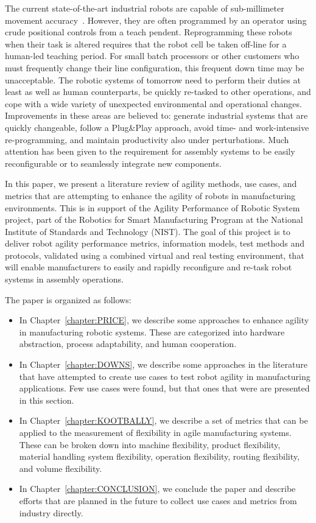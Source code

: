 The current state-of-the-art industrial robots are capable of sub-millimeter movement accuracy~\cite{Briot.2009}. However, they are often programmed by an operator using crude positional controls from a teach pendent. Reprogramming these robots when their task is altered requires that the robot cell be taken off-line for a human-led teaching period. For small batch processors or other
customers who must frequently change their line configuration, this frequent down time may be unacceptable. The robotic systems of tomorrow need to perform their duties at least as well as human counterparts, be quickly re-tasked to other operations, and cope with a wide variety of unexpected environmental and operational changes. Improvements in these areas are believed to: generate industrial systems that are quickly changeable, follow a Plug\&Play approach, avoid time- and work-intensive re-programming,
and maintain productivity also under perturbations. Much attention has been given to the requirement for assembly systems to be easily reconfigurable or to seamlessly integrate
new components.

In this paper, we present a literature review of agility methods, use cases, and metrics that are attempting to enhance the agility of robots in manufacturing environments.  This is in support of the Agility Performance of Robotic System project, part of the Robotics for Smart Manufacturing Program at the National Institute of Standards and Technology (NIST). The goal of this project is to deliver robot agility performance metrics, information models, test methods and protocols, validated using a combined virtual and real testing environment, that will enable manufacturers to easily and rapidly reconfigure and re-task robot systems in assembly operations.

The paper is organized as follows:
\begin{itemize}
\item In Chapter~\ref{chapter:PRICE}, we describe some approaches to enhance agility in manufacturing robotic systems. These are categorized into hardware abstraction, process adaptability, and human cooperation.
\item In Chapter~\ref{chapter:DOWNS}, we describe some approaches in the literature that have attempted to create use cases to test robot agility in manufacturing applications. Few use cases were found, but that ones that were are presented in this section.
\item In Chapter~\ref{chapter:KOOTBALLY}, we describe a set of metrics that can be applied to the measurement of flexibility in agile manufacturing systems. These can be broken down into machine flexibility, product flexibility, material handling system flexibility, operation flexibility, routing flexibility, and volume flexibility.
\item In Chapter~\ref{chapter:CONCLUSION}, we conclude the paper and describe efforts that are planned in the future to collect use cases and metrics from industry directly.
\end{itemize}
